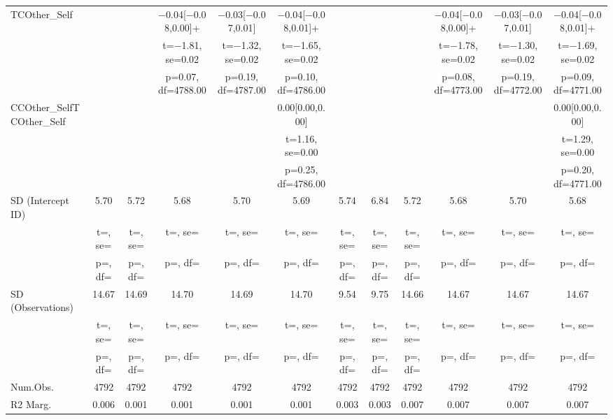 \documentclass[]{report}
\begin{document}
\begin{table}
{\begin{tabular}[t]{lccccccccccc}
		TCOther\_Self &  &  & \num{-0.04}[\num{-0.08},\num{0.00}]+ & \num{-0.03}[\num{-0.07},\num{0.01}] & \num{-0.04}[\num{-0.08},\num{0.01}]+ &  &  &  & \num{-0.04}[\num{-0.08},\num{0.00}]+ & \num{-0.03}[\num{-0.07},\num{0.01}] & \num{-0.04}[\num{-0.08},\num{0.01}]+\\
		&  &  & t=\num{-1.81}, se=\num{0.02} & t=\num{-1.32}, se=\num{0.02} & t=\num{-1.65}, se=\num{0.02} &  &  &  & t=\num{-1.78}, se=\num{0.02} & t=\num{-1.30}, se=\num{0.02} & t=\num{-1.69}, se=\num{0.02}\\
		&  &  & p=\num{0.07}, df=\num{4788.00} & p=\num{0.19}, df=\num{4787.00} & p=\num{0.10}, df=\num{4786.00} &  &  &  & p=\num{0.08}, df=\num{4773.00} & p=\num{0.19}, df=\num{4772.00} & p=\num{0.09}, df=\num{4771.00}\\
		CCOther\_SelfTCOther\_Self &  &  &  &  & \num{0.00}[\num{0.00},\num{0.00}] &  &  &  &  &  & \num{0.00}[\num{0.00},\num{0.00}]\\
		&  &  &  &  & t=\num{1.16}, se=\num{0.00} &  &  &  &  &  & t=\num{1.29}, se=\num{0.00}\\
		&  &  &  &  & p=\num{0.25}, df=\num{4786.00} &  &  &  &  &  & p=\num{0.20}, df=\num{4771.00}\\
		SD (Intercept ID) & \num{5.70} & \num{5.72} & \num{5.68} & \num{5.70} & \num{5.69} & \num{5.74} & \num{6.84} & \num{5.72} & \num{5.68} & \num{5.70} & \num{5.68}\\
		& t=, se= & t=, se= & t=, se= & t=, se= & t=, se= & t=, se= & t=, se= & t=, se= & t=, se= & t=, se= & t=, \vphantom{1} se=\\
		& p=, df= & p=, df= & p=, df= & p=, df= & p=, df= & p=, df= & p=, df= & p=, df= & p=, df= & p=, df= & p=, \vphantom{1} df=\\
		SD (Observations) & \num{14.67} & \num{14.69} & \num{14.70} & \num{14.69} & \num{14.70} & \num{9.54} & \num{9.75} & \num{14.66} & \num{14.67} & \num{14.67} & \num{14.67}\\
		& t=, se= & t=, se= & t=, se= & t=, se= & t=, se= & t=, se= & t=, se= & t=, se= & t=, se= & t=, se= & t=, se=\\
		& p=, df= & p=, df= & p=, df= & p=, df= & p=, df= & p=, df= & p=, df= & p=, df= & p=, df= & p=, df= & p=, df=\\
		\midrule
		Num.Obs. & \num{4792} & \num{4792} & \num{4792} & \num{4792} & \num{4792} & \num{4792} & \num{4792} & \num{4792} & \num{4792} & \num{4792} & \num{4792}\\
		R2 Marg. & \num{0.006} & \num{0.001} & \num{0.001} & \num{0.001} & \num{0.001} & \num{0.003} & \num{0.003} & \num{0.007} & \num{0.007} & \num{0.007} & \num{0.007}\\

\end{tabular}}
\end{table}
\end{document}
